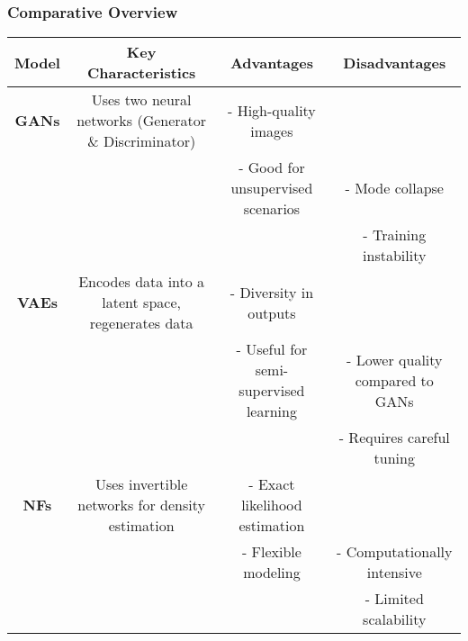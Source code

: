 \documentclass[aspectratio=169]{beamer}
\begin{document}
\begin{frame}[fragile]
    \frametitle{Comparative Overview}
    \begin{table}[h]
        \centering
        \begin{tabular}{|c|c|c|c|}
            \hline
            \textbf{Model} & \textbf{Key Characteristics} & \textbf{Advantages} & \textbf{Disadvantages} \\
            \hline
            \textbf{GANs} & Uses two neural networks (Generator \& Discriminator) & - High-quality images \\ 
            & & - Good for unsupervised scenarios & - Mode collapse \\
            & & & - Training instability \\
            \hline
            \textbf{VAEs} & Encodes data into a latent space, regenerates data & - Diversity in outputs \\ 
            & & - Useful for semi-supervised learning & - Lower quality compared to GANs \\
            & & & - Requires careful tuning \\
            \hline
            \textbf{NFs} & Uses invertible networks for density estimation & - Exact likelihood estimation \\ 
            & & - Flexible modeling & - Computationally intensive \\
            & & & - Limited scalability \\
            \hline
        \end{tabular}
    \end{table}
\end{frame}
\end{document}
